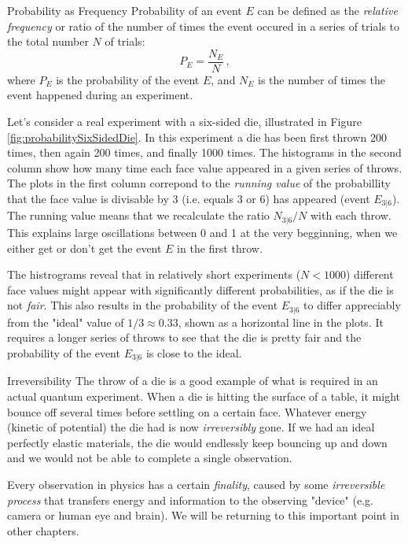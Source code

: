 \begin{mydef}{Probability as Frequency}
	Probability of an event $E$  can be defined as the \emph{relative frequency} or ratio of the number of times the event occured in a series of trials to the total number $N$ of trials:
	\[
	P_E = \frac{N_E}{N}\,,
	\]
	where $P_E$ is the probability of the event $E$, and $N_E$ is the number of times the event happened during an experiment.
\end{mydef}

Let's consider a real experiment with a six-sided die, illustrated in Figure \ref{fig:probabilitySixSidedDie}. In this experiment a die has been first thrown 200 times, then again 200 times, and finally 1000 times. The histograms in the second column show how many time each face value appeared in a given series of throws. The plots in the first column correpond to the \emph{running value} of the probabillity that the face value is divisable by 3 (i.e. equals 3 or 6) has appeared (event $E_{3|6}$). The running value means that we recalculate the ratio $N_{3|6}/N$ with each throw. This explains large oscillations between 0 and 1 at the very begginning, when we either get or don't get the event $E$ in the first throw.

The histrograms reveal that in relatively short experiments ($N<1000$) different face values might appear with significantly different probabilities, as if the die is not \emph{fair}. This also results in the probability of the event $E_{3|6}$ to differ appreciably from the "ideal" value of $1/3\approx 0.33$, shown as a horizontal line in the plots. It requires a longer series of throws to see that the die is pretty fair and the probability of the event $E_{3|6}$ is close to the ideal.

\begin{myrem}{Irreversibility}
	The throw of a die is a good example of what is required in an actual quantum experiment. When a die is hitting the surface of a table, it might bounce off several times before settling on a certain face. Whatever energy (kinetic of potential) the die had is now \emph{irreversibly} gone. If we had an ideal perfectly elastic materials, the die would endlessly keep bouncing up and down and we would not be able to complete a single observation.
	
	Every observation in physics has a certain \emph{finality}, caused by some \emph{irreversible process} that transfers energy and information to the observing "device" (e.g. camera or human eye and brain). We will be returning to this important point in other chapters.
\end{myrem}

